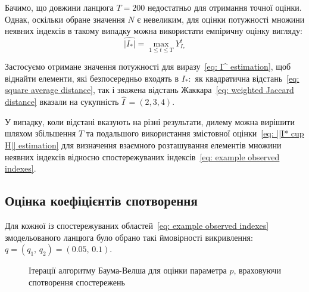 \documentclass[]{iptconf}
\theoremstyle{plain}
\begin{document}
Бачимо, що довжини ланцюга $T=200$ недостатньо для отримання точної оцінки. Однак, оскільки обране значення $N$ є невеликим, для оцінки потужності множини неявних індексів в такому випадку можна використати емпіричну оцінку вигляду:
\begin{equation*}
    \widehat{|I_*|}=\max\limits_{1\leqslant t \leqslant T} Y^t_{I_*}
\end{equation*}

Застосуємо отримане значення потужності для виразу~\eqref{eq: I^ estimation}, щоб віднайти елементи, які безпосередньо входять в $I_*:$ як квадратична відстань~\eqref{eq: square average distance}, так і зважена відстань Жаккара~\eqref{eq: weighted Jaccard distance} вказали на сукупність $\widehat{I\,}=(2,3,4)$.

У випадку, коли відстані вказують на різні результати, дилему можна вирішити шляхом збільшення $T$ та подальшого використання змістовної оцінки~\eqref{eq: ||I* cup H|| estimation} для визначення взаємного розташування елементів множини неявних індексів відносно спостережуваних індексів~\eqref{eq: example observed indexes}.

\subsection*{Оцінка коефіцієнтів спотворення}

Для кожної із спостережуваних областей~\eqref{eq: example observed indexes} змодельованого ланцюга було обрано такі ймовірності викривлення: $q = (q_1,\,q_2) = (0.05,\,0.1)$. 

\begin{figure}[H]\centering
    \caption{Ітерації алгоритму Баума-Велша для оцінки параметра $p$, враховуючи спотворення спостережень}
    \label{pic: p distortion baum-welch learning algorithm}
\end{figure}
\end{document}
